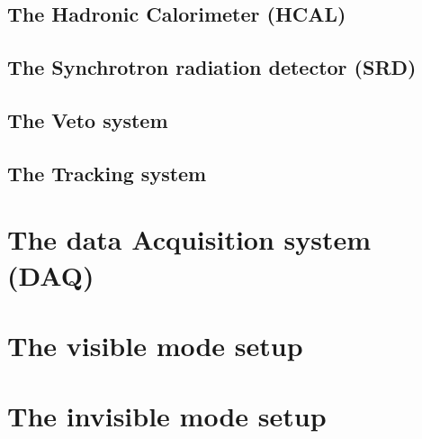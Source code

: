 \subsection{The Hadronic Calorimeter (HCAL)}

\subsection{The Synchrotron radiation detector (SRD)}

\subsection{The Veto system}

\subsection{The Tracking system}

\section{The data Acquisition system (DAQ)}

\section{The visible mode setup}

\section{The invisible mode setup}

